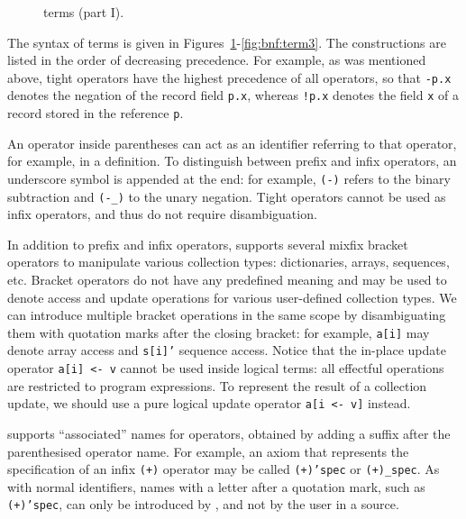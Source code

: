 \begin{figure}[p!]
\begin{center}\end{center}
\caption{\whyml terms (part I).}
\label{fig:bnf:term1}
\end{figure}

The syntax of \whyml terms is given in
Figures~\ref{fig:bnf:term1}-\ref{fig:bnf:term3}.
The constructions are listed in the order of
decreasing precedence.
For example, as was mentioned above,
tight operators have the highest precedence of all operators,
so that \texttt{-p.x} denotes the negation of the
record field \texttt{p.x}, whereas \texttt{!p.x}
denotes the field \texttt{x} of a record stored
in the reference \texttt{p}.

An operator inside parentheses can act as an identifier
referring to that operator, for example, in a definition.
To distinguish between prefix and infix operators, an
underscore symbol is appended at the end: for example,
\texttt{(-)} refers to the binary subtraction and
\texttt{(-\_)} to the unary negation.
Tight operators cannot be used as infix operators,
and thus do not require disambiguation.

In addition to prefix and infix operators, \whyml
supports several mixfix bracket operators to
manipulate various collection types: dictionaries,
arrays, sequences, etc. Bracket operators do not have
any predefined meaning and may be used to denote access
and update operations for various user-defined collection types.
We can introduce multiple bracket operations in the same scope
by disambiguating them with quotation marks after the closing
bracket: for example, \texttt{a[i]} may denote array access
and \texttt{s[i]'} sequence access.
Notice that the in-place update operator \texttt{a[i] <- v}
cannot be used inside logical terms: all effectful operations
are restricted to program expressions. To represent the result
of a collection update, we should use a pure logical update
operator \texttt{a[i <- v]} instead.

\whyml supports ``associated'' names for operators, obtained
by adding a suffix after the parenthesised operator name.
For example, an axiom that represents the specification of an
infix \texttt{(+)} operator may be called \texttt{(+)'spec}
or \texttt{(+)\_spec}. As with normal identifiers, names
with a letter after a quotation mark, such as \texttt{(+)'spec},
can only be introduced by \why, and not by the user in a \whyml
source.

